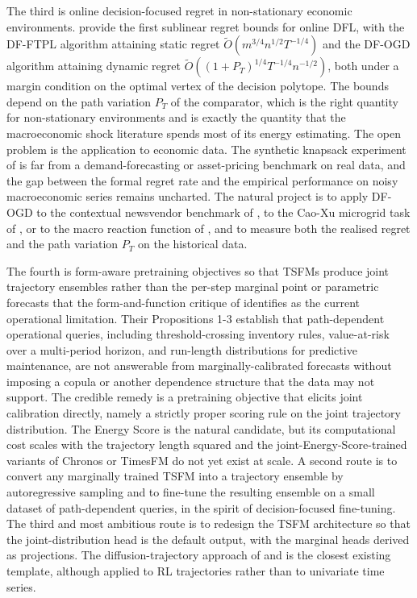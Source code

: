 The third is online decision-focused regret in non-stationary economic
environments. \citet{Capitaine2025} provide the first sublinear regret
bounds for online DFL, with the DF-FTPL algorithm attaining static regret
$\widetilde O(m^{3/4} n^{1/2} T^{-1/4})$ and the DF-OGD algorithm attaining
dynamic regret $\widetilde O((1 + P_T)^{1/4} T^{-1/4} n^{-1/2})$, both
under a margin condition on the optimal vertex of the decision polytope.
The bounds depend on the path variation $P_T$ of the comparator, which is
the right quantity for non-stationary environments and is exactly the
quantity that the macroeconomic shock literature spends most of its energy
estimating. The open problem is the application to economic data. The
synthetic knapsack experiment of \citet{Capitaine2025} is far from a
demand-forecasting or asset-pricing benchmark on real data, and the gap
between the formal regret rate and the empirical performance on noisy
macroeconomic series remains uncharted. The natural project is to apply
DF-OGD to the contextual newsvendor benchmark of \citet{BanRudin2019}, to
the Cao-Xu microgrid task of \citet{CaoXu2025}, or to the macro reaction
function of \citet{HinterlangTaenzer2024}, and to measure both the
realised regret and the path variation $P_T$ on the historical data.

The fourth is form-aware pretraining objectives so that TSFMs produce
joint trajectory ensembles rather than the per-step marginal point or
parametric forecasts that the form-and-function critique of
\citet{PerezDiaz2025} identifies as the current operational limitation.
Their Propositions 1-3 establish that path-dependent operational queries,
including threshold-crossing inventory rules, value-at-risk over a
multi-period horizon, and run-length distributions for predictive
maintenance, are not answerable from marginally-calibrated forecasts
without imposing a copula or another dependence structure that the data
may not support. The credible remedy is a pretraining objective that
elicits joint calibration directly, namely a strictly proper scoring rule
on the joint trajectory distribution. The Energy Score is the natural
candidate, but its computational cost scales with the trajectory length
squared and the joint-Energy-Score-trained variants of Chronos or TimesFM
do not yet exist at scale. A second route is to convert any marginally
trained TSFM into a trajectory ensemble by autoregressive sampling and to
fine-tune the resulting ensemble on a small dataset of path-dependent
queries, in the spirit of decision-focused fine-tuning. The third and
most ambitious route is to redesign the TSFM architecture so that the
joint-distribution head is the default output, with the marginal heads
derived as projections. The diffusion-trajectory approach of
\citet{Janner2022diffuser} and \citet{Ajay2023} is the closest existing
template, although applied to RL trajectories rather than to univariate
time series.

